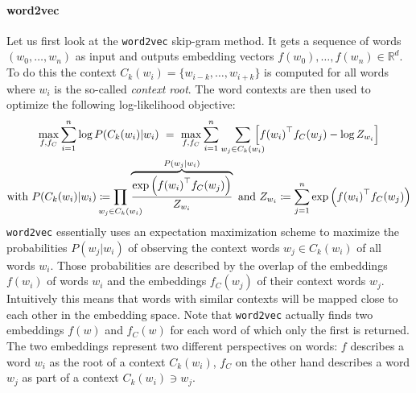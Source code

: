 \paragraph{word2vec}
Let us first look at the \texttt{word2vec} skip-gram method.
It gets a sequence of words $(w_0, \dots, w_n)$ as input and outputs embedding vectors $f(w_0), \dots, f(w_n) \in \mathbb{R}^d$.
To do this the context $C_k(w_i) = \{ w_{i-k}, \dots, w_{i + k} \}$ is computed for all words where $w_i$ is the so-called \textit{context root}.
The word contexts are then used to optimize the following log-likelihood objective:
\begin{gather}
	\max_{f, f_C} \sum_{i = 1}^n \log P(C_k(w_i) | w_i)\ =\ \max_{f, f_C} \sum_{i = 1}^n \smashoperator[r]{\sum_{w_j \in C_k(w_i)}}\, \left[ {f(w_i)}^\top f_C(w_j) - \log Z_{w_i} \right] \label{eq:related:word2vec}\\
	\text{with } P(C_k(w_i) | w_i) \coloneqq \prod_{\mathclap{w_j \in C_k(w_i)}}\, \overbrace{\frac{\exp\left({f(w_i)}^\top f_C(w_j)\right)}{Z_{w_i}}}^{P(w_j | w_i)}
	\text{ and } Z_{w_i} \coloneqq \sum_{j = 1}^n \exp\left({f(w_i)}^\top f_C(w_j)\right) \nonumber
\end{gather}
\texttt{word2vec} essentially uses an expectation maximization scheme to maximize the probabilities $P(w_j | w_i)$ of observing the context words $w_j \in C_k(w_i)$ of all words $w_i$.
Those probabilities are described by the overlap of the embeddings $f(w_i)$ of words $w_i$ and the embeddings $f_C(w_j)$ of their context words $w_j$.
Intuitively this means that words with similar contexts will be mapped close to each other in the embedding space.
Note that \texttt{word2vec} actually finds two embeddings $f(w)$ and $f_C(w)$ for each word of which only the first is returned.
The two embeddings represent two different perspectives on words: $f$ describes a word $w_i$ as the root of a context $C_k(w_i)$, $f_C$ on the other hand describes a word $w_j$ as part of a context $C_k(w_i) \ni w_j$.

